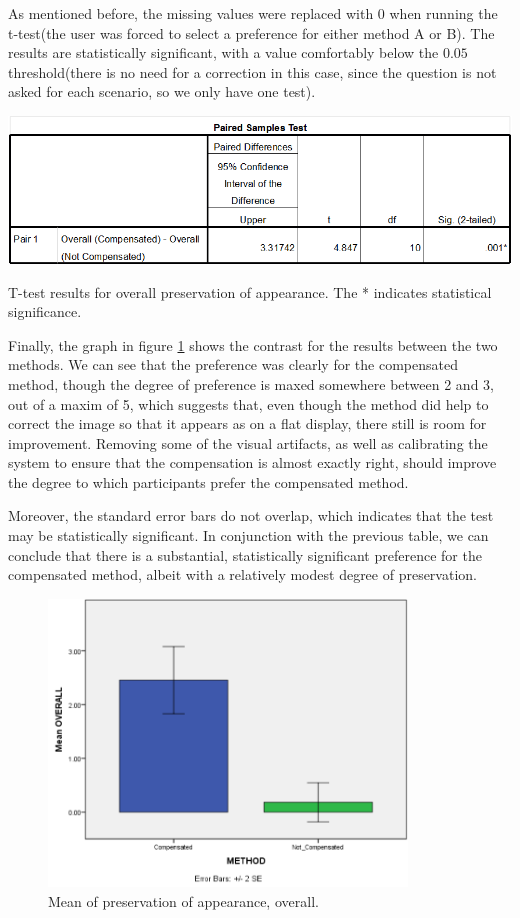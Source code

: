 \documentclass[]{article}
\begin{document}
As mentioned before, the missing values were replaced with 0 when running the t-test(the user was forced to select a preference for either method A or B). The results are statistically significant, with a value comfortably below the $0.05$ threshold(there is no need for a correction in this case, since the question is not asked for each scenario, so we only have one test).

\begin{table}[!h]
  \includegraphics[width=\linewidth]{figures/results/OPOA_Test.PNG}
  \caption{T-test results for overall preservation of appearance. The * indicates statistical significance.}
  \label{tabel:OPOA_Test}
\end{table}

Finally, the graph in figure \ref{fig:OPOA_Graph} shows the contrast for the results between the two methods. We can see that the preference was clearly for the compensated method, though the degree of preference is maxed somewhere between 2 and 3, out of a maxim of 5, which suggests that, even though the method did help to correct the image so that it appears as on a flat display, there still is room for improvement. Removing some of the visual artifacts, as well as calibrating the system to ensure that the compensation is almost exactly right, should improve the degree to which participants prefer the compensated method. 

Moreover, the standard error bars do not overlap, which indicates that the test may be statistically significant. In conjunction with the previous table, we can conclude that there is a substantial, statistically significant preference for the compensated method, albeit with a relatively modest degree of preservation.

\begin{figure}[!h]
    \centering
    \includegraphics[width=0.85\textwidth]{figures/results/OPOA_Graph.PNG}
    \caption{Mean of preservation of appearance, overall.}
    \label{fig:OPOA_Graph}
\end{figure}
\end{document}
